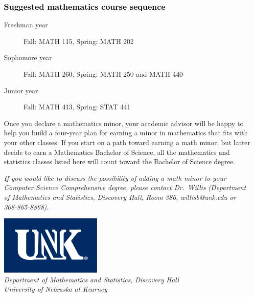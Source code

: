 \documentclass[10pt]{article}
\begin{document}
\noindent


\subsubsection*{\textcolor{black}{Suggested mathematics course sequence}}

\begin{description}
   \item[\phantom{xxx} Freshman year] Fall: MATH 115, Spring:  MATH 202
      \item[\phantom{xxx} Sophomore year]  Fall: MATH 260,  Spring: MATH 250  and MATH 440
     \item[\phantom{xxx} Junior year]  Fall: MATH 413,  Spring: STAT 441
 \end{description}
  \vspace{0.1in}

 \noindent Once you declare a mathematics minor, your academic advisor will be happy to help you build a four-year plan for earning a minor in mathematics that fits with your other classes.  If you start on a path toward earning a math minor, but latter decide to earn a  Mathematics Bachelor of Science, all the mathematics and statistics  classes listed here will count toward the Bachelor of Science degree.

   \vspace{0.1in}

\noindent \textcolor{unkblue}{\emph{If you would like to discuss the possibility of  adding a math minor to your Computer Science Comprehensive degree, please contact \mbox{Dr.\ Willis} (Department of Mathematics and Statistics,  Discovery Hall, Room 386, willisb@unk.edu or 308-865-8868).}}


\newpage

\begin{flushleft}
\includegraphics[scale=0.25]{unk-logo}\\
 \emph{\textcolor{unkblue}{Department of Mathematics and Statistics, Discovery Hall}} \\
  \emph{\textcolor{unkblue}{University of Nebraska at Kearney}}
\end{flushleft}

\vspace{-0.1in}
\end{document}

